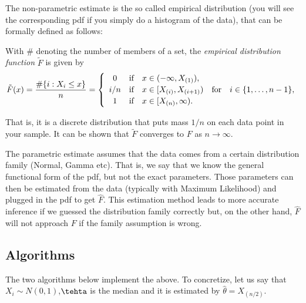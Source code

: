 \documentclass[12pt]{article}
\begin{document}
\vspace{0.5cm}

The non-parametric estimate is the so called empirical distribution (you will see the corresponding pdf if you simply do a histogram of the data), that can be formally defined as follows:

\begin{framed}
\begin{defn}
     With \# denoting the number of members of a set, the \emph{empirical 
     distribution function} $\tilde{F}$ is given by 
  \[
     \tilde{F}(x)= \frac{\#\{i: X_i\leq x\}}{n}= \left \{\begin{array}{cclc}
          0 & \mbox{if}& x \in (-\infty, X_{(1)}),\vspace{2pt}\\
          i/n & \mbox{if}& x \in [X_{(i)}, X_{(i+1)})&\mbox{for}\quad i \in
          \{1, \ldots, n-1\},\vspace{2pt}\\
          1 & \mbox{if} &x \in [X_{(n)}, \infty).
     \end{array}\right.
  \]
\end{defn}
\end{framed}

\noindent That is, it is a discrete distribution that puts mass $1/n$ on each data point in your sample. It can be shown that $\tilde{F}$ converges to $F$ as $n \rightarrow \infty$.  

\vspace{0.5cm}

The parametric estimate assumes that the data comes from a certain distribution family (Normal, Gamma etc). That is, we say that we know the general functional form of the pdf, but not the exact parameters. Those parameters can then be estimated from the data (typically with Maximum Likelihood) and plugged in the pdf to get $\hat{F}$. This estimation method leads to more accurate inference if we guessed the distribution family correctly but, on the other hand, $\hat{F}$ will not approach $F$ if the family assumption is wrong. 

\subsection{Algorithms}

The two algorithms below implement the above. To concretize, let us say that $X_i \sim N(0,1)$,$\tehta$ is the median and it is estimated by $\hat{\theta} = X_{(n/2)}$.
\end{document}
